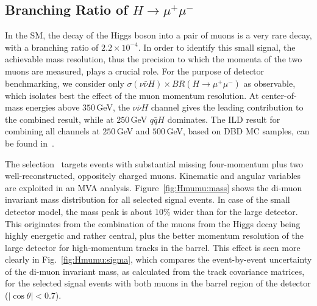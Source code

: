 \subsection{Branching Ratio of \texorpdfstring{$H \to \mu^+\mu^-$}{H -> mm}}

In the SM, the decay of the Higgs boson into a pair of muons is a very rare decay, with a branching ratio of $2.2 \times 10^{-4}$. In order to identify this small signal, the achievable mass resolution, thus the precision to which the momenta of the two muons are measured, plays a crucial role. For the purpose of detector benchmarking, we consider only 
$\sigma(\nu\bar{\nu} H)\times BR(H\to \mu^+\mu^-)$ as observable, which isolates best the effect of the muon momentum resolution. At center-of-mass energies above $350$\,GeV, the $\nu\bar{\nu} H$ channel gives the leading contribution to the combined result, while at $250$\,GeV $q\bar{q} H$ dominates. The ILD result for combining all channels at $250$\,GeV and $500$\,GeV, based on DBD MC samples, can be found in~\cite{Kawada:2019isz}.

The selection~\cite{ILDNote:Hmumu} targets events with substantial missing four-momentum plus 
two well-reconstructed, oppositely charged muons. Kinematic and angular variables are exploited in an MVA analysis. Figure~\ref{fig:Hmumu:mass} shows the di-muon invariant mass distribution for all selected signal events. In case of the small detector model, the mass peak is about $10\%$ wider than for the large detector. This originates from the combination of the muons from the Higgs decay being highly energetic and rather central, plus the better momentum resolution of the large detector for high-momentum tracks in the barrel. 
This effect is seen more clearly in Fig.~\ref{fig:Hmumu:sigma}, which compares the event-by-event uncertainty of the di-muon invariant mass, as calculated from the track covariance matrices, for the selected signal events with both muons in the barrel region of the detector ($|\cos{\theta}| < 0.7$). 



